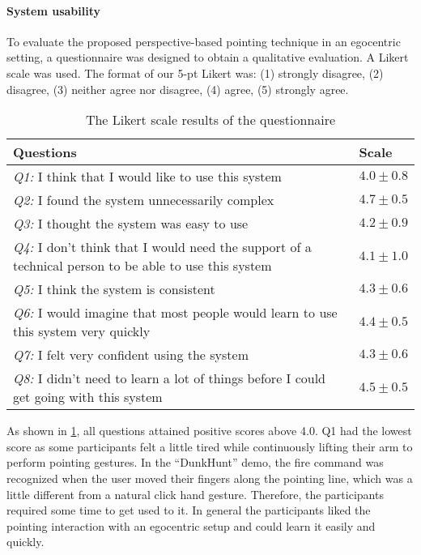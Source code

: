 \paragraph{System usability} To evaluate the proposed perspective-based pointing technique in an egocentric setting, a questionnaire was designed to obtain a qualitative evaluation. A Likert scale was used. The format of our 5-pt Likert was: (1) strongly disagree, (2) disagree, (3) neither agree nor disagree, (4) agree, (5) strongly agree. 
\begin{table}
	\caption{The Likert scale results of the questionnaire}
	\label{tb:4-pAST:questionnaire}
	\scriptsize
	\begin{center}
		\begin{tabular}{p{7.5cm}|p{1.2cm}}
			Questions & Scale \\
			\hline
			\textit{Q1:} I think that I would like to use this system &  $4.0\pm0.8$ \\
			\textit{Q2:} I found the system unnecessarily complex & $4.7\pm0.5$ \\
			\textit{Q3:} I thought the system was easy to use & $4.2\pm0.9$ \\
			\textit{Q4:} I don't think that I would need the support of a technical person to be able to use this system & $4.1\pm1.0$\\
			\textit{Q5:} I think the system is consistent & $4.3\pm0.6$ \\
			\textit{Q6:} I would imagine that most people would learn to use this system very quickly & $4.4\pm0.5$ \\
			\textit{Q7:} I felt very confident using the system & $4.3\pm0.6$ \\
			\textit{Q8:} I didn't need to learn a lot of things before I could get going with this system & $4.5\pm0.5$
		\end{tabular}
	\end{center}
\end{table}
As shown in \tablename{ \ref{tb:4-pAST:questionnaire}}, all questions attained positive scores above 4.0. Q1 had the lowest score as some participants felt a little tired while continuously lifting their arm to perform pointing gestures. In the ``DunkHunt'' demo, the fire command was recognized when the user moved their fingers along the pointing line, which was a little different from a natural click hand gesture. Therefore, the participants required some time to get used to it. In general the participants liked the pointing interaction with an egocentric setup and could learn it easily and quickly.

